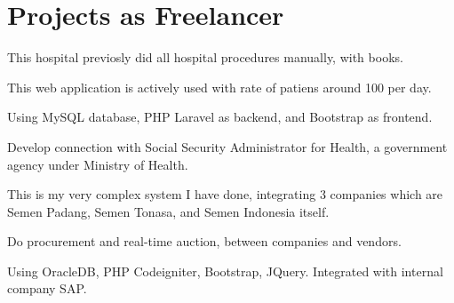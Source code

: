\documentclass[letterpaper]{deedy-resume} %
\begin{document}
\begin{minipage}[t]{0.66\textwidth}

\section{Projects as Freelancer}

\begin{tightitemize}
\item This hospital previosly did all hospital procedures manually, with books.
\item This web application is actively used with rate of patiens around 100 per day.
\item Using MySQL database, PHP Laravel as backend, and Bootstrap as frontend.
\item Develop connection with Social Security Administrator for Health, a government agency under Ministry of Health.
\end{tightitemize}
\sectionspace

\begin{tightitemize}
\item This is my very complex system I have done, integrating 3 companies which are Semen Padang, Semen Tonasa, and Semen Indonesia itself.
\item Do procurement and real-time auction, between companies and vendors.
\item Using OracleDB, PHP Codeigniter, Bootstrap, JQuery. Integrated with internal company SAP.
\end{tightitemize}
\sectionspace



\end{minipage}
\end{document}
